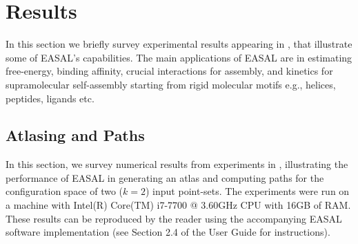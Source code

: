 \section{Results}
\label{sec:results}
In this section we briefly survey experimental results appearing in
\cite{Ozkan2014MainEasal,Ozkan2014MC,Wu2014Virus}, that illustrate some of EASAL's
capabilities. The main applications of EASAL are in
estimating free-energy, binding affinity, crucial interactions for assembly,
and kinetics for supramolecular self-assembly starting from rigid molecular
motifs e.g., helices, peptides, ligands etc.

\subsection{Atlasing and Paths} 
\label{sec:atlasandpath}
\begin{table}[h]

\caption{Time on a standard laptop (see text) to stratify the configuration
space of pairwise constrained point-sets with the tolerance set to $(1.0-0.75)
\times$  sum of radii. The input point-set with $n=6$ is \exref{\toyhelix} and
the $n=20$ input is \exref{\bighelix}. Note that in $20^*$, only one 
5D and its children 4D regions are sampled and in $20^\dag$, only one 5D and its 
descendant 4D and 3D region are sampled.} 
\label{table:stratification}
\end{table}

In this section, we survey numerical results
from experiments in \cite{Ozkan2014MainEasal}, illustrating the performance of
EASAL in generating an atlas and computing paths for the configuration space of
two ($k=2$) input point-sets. The experiments were run on a machine with 
Intel(R) Core(TM) i7-7700 @ 3.60GHz CPU with 16GB of RAM. These results can be
reproduced by the reader using the accompanying EASAL software implementation
(see Section 2.4 of the User Guide for instructions).


